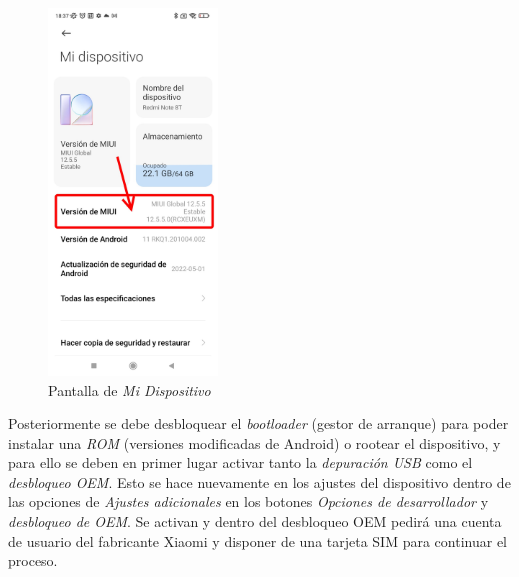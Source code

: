\documentclass[12pt,a4paper,onecolumn,oneside]{report}
\begin{document}
\begin{figure}[H] 
\centering
  \includegraphics[width=0.4\textwidth]{figuras/root1.png}
  \caption[Pantalla de \textit{Mi Dispositivo}]{Pantalla de \textit{Mi Dispositivo}\\
  }
  \label{fig:root1}
\end{figure}

Posteriormente se debe desbloquear el \textit{bootloader} (gestor de arranque) para poder instalar una \textit{ROM} (versiones modificadas de Android) o rootear el dispositivo, y para ello se deben en primer lugar activar tanto la \textit{depuración USB} como el \textit{desbloqueo OEM}. Esto se hace nuevamente en los ajustes del dispositivo dentro de las opciones de \textit{Ajustes adicionales} en los botones \textit{Opciones de desarrollador} y \textit{desbloqueo de OEM}. Se activan y dentro del desbloqueo OEM pedirá una cuenta de usuario del fabricante Xiaomi y disponer de una tarjeta SIM para continuar el proceso.
\end{document}
